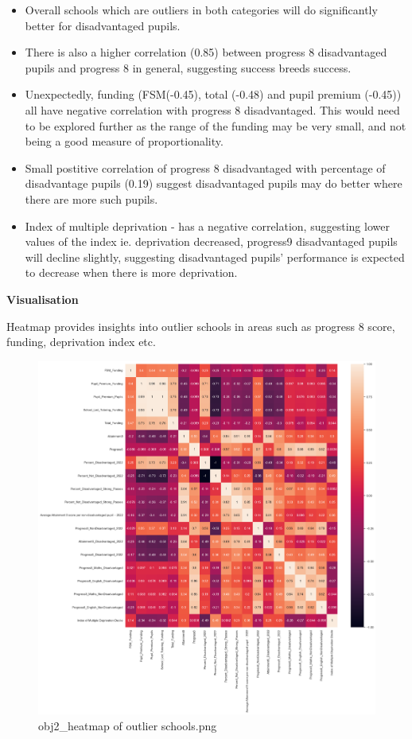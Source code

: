 \documentclass[
  letterpaper,
  DIV=11,
  numbers=noendperiod]{scrartcl}
\providecommand{\tightlist}{%
  \setlength{\itemsep}{0pt}\setlength{\parskip}{0pt}}\usepackage{longtable,booktabs,array}
\begin{document}
\begin{itemize}
\tightlist
\item
  Overall schools which are outliers in both categories will do
  significantly better for disadvantaged pupils.
\item
  There is also a higher correlation (0.85) between progress 8
  disadvantaged pupils and progress 8 in general, suggesting success
  breeds success.
\item
  Unexpectedly, funding (FSM(-0.45), total (-0.48) and pupil premium
  (-0.45)) all have negative correlation with progress 8 disadvantaged.
  This would need to be explored further as the range of the funding may
  be very small, and not being a good measure of proportionality.
\item
  Small postitive correlation of progress 8 disadvantaged with
  percentage of disadvantage pupils (0.19) suggest disadvantaged pupils
  may do better where there are more such pupils.
\item
  Index of multiple deprivation - has a negative correlation, suggesting
  lower values of the index ie. deprivation decreased, progress9
  disadvantaged pupils will decline slightly, suggesting disadvantaged
  pupils' performance is expected to decrease when there is more
  deprivation.
\end{itemize}

\textbf{Visualisation}

Heatmap provides insights into outlier schools in areas such as progress
8 score, funding, deprivation index etc.

\begin{figure}[H]

{\centering \includegraphics{P4DS_A2_Data_Analysis_Project_files/figure-pdf/cell-193-2-obj2_heatmap of outlier schools.png}

}

\caption{obj2\_heatmap of outlier schools.png}

\end{figure}%
\end{document}
